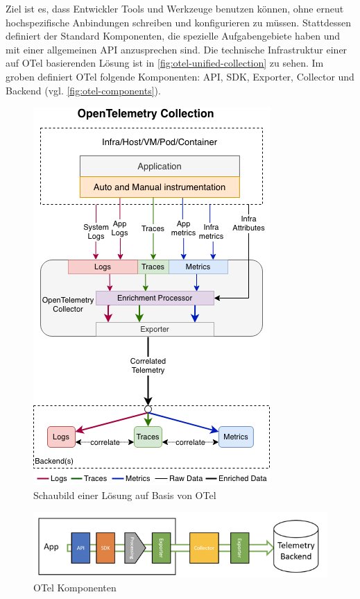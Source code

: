 Ziel ist es, dass Entwickler Tools und Werkzeuge benutzen können, ohne erneut hochspezifische Anbindungen schreiben und konfigurieren zu müssen. Stattdessen definiert der Standard Komponenten, die spezielle Aufgabengebiete haben und mit einer allgemeinen API anzusprechen sind. Die technische Infrastruktur einer auf OTel basierenden Lösung ist in \autoref{fig:otel-unified-collection} zu sehen. Im groben definiert OTel folgende Komponenten: API, SDK, Exporter, Collector und Backend (vgl. \autoref{fig:otel-components}).


\begin{figure}[H]
	\centering
	\includegraphics[width=\linewidth]{img/03_methoden/otel_unified-collection_2.png}
	\caption{Schaubild einer Lösung auf Basis von OTel \cite{OpenTelemetryUnifiedCollection}}
	\label{fig:otel-unified-collection}
\end{figure}

\begin{figure}[H]
	\centering
	\includegraphics[width=0.75\linewidth]{img/03_methoden/dynatrace_otel-components.png}
	\caption{OTel Komponenten \cite{DynatraceOTelComponents}}
	\label{fig:otel-components}
\end{figure}